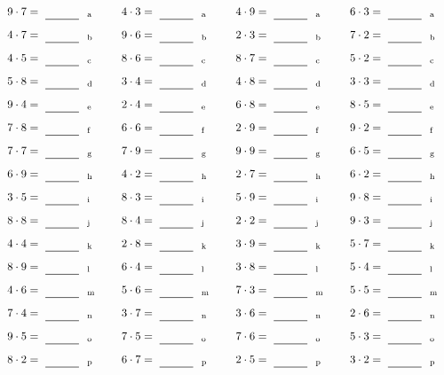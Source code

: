 \documentclass
[
  draft    = true,
  fontsize = 11pt,
  parskip  = half-
]
{scrartcl}
\begin{document}
\par\vfill\par
\begin{align*}
    \pline{9\cdot7}&=\rline{a}
  & \pline{4\cdot3}&=\rline{a}
  & \pline{4\cdot9}&=\rline{a}
  & \pline{6\cdot3}&=\rline{a} \\[1ex]
    \pline{4\cdot7}&=\rline{b}
  & \pline{9\cdot6}&=\rline{b}
  & \pline{2\cdot3}&=\rline{b}
  & \pline{7\cdot2}&=\rline{b} \\[1ex]
    \pline{4\cdot5}&=\rline{c}
  & \pline{8\cdot6}&=\rline{c}
  & \pline{8\cdot7}&=\rline{c}
  & \pline{5\cdot2}&=\rline{c} \\[1ex]
    \pline{5\cdot8}&=\rline{d}
  & \pline{3\cdot4}&=\rline{d}
  & \pline{4\cdot8}&=\rline{d}
  & \pline{3\cdot3}&=\rline{d} \\[1ex]
    \pline{9\cdot4}&=\rline{e}
  & \pline{2\cdot4}&=\rline{e}
  & \pline{6\cdot8}&=\rline{e}
  & \pline{8\cdot5}&=\rline{e} \\[1ex]
    \pline{7\cdot8}&=\rline{f}
  & \pline{6\cdot6}&=\rline{f}
  & \pline{2\cdot9}&=\rline{f}
  & \pline{9\cdot2}&=\rline{f} \\[1ex]
    \pline{7\cdot7}&=\rline{g}
  & \pline{7\cdot9}&=\rline{g}
  & \pline{9\cdot9}&=\rline{g}
  & \pline{6\cdot5}&=\rline{g} \\[1ex]
    \pline{6\cdot9}&=\rline{h}
  & \pline{4\cdot2}&=\rline{h}
  & \pline{2\cdot7}&=\rline{h}
  & \pline{6\cdot2}&=\rline{h} \\[1ex]
    \pline{3\cdot5}&=\rline{i}
  & \pline{8\cdot3}&=\rline{i}
  & \pline{5\cdot9}&=\rline{i}
  & \pline{9\cdot8}&=\rline{i} \\[1ex]
    \pline{8\cdot8}&=\rline{j}
  & \pline{8\cdot4}&=\rline{j}
  & \pline{2\cdot2}&=\rline{j}
  & \pline{9\cdot3}&=\rline{j} \\[1ex]
    \pline{4\cdot4}&=\rline{k}
  & \pline{2\cdot8}&=\rline{k}
  & \pline{3\cdot9}&=\rline{k}
  & \pline{5\cdot7}&=\rline{k} \\[1ex]
    \pline{8\cdot9}&=\rline{l}
  & \pline{6\cdot4}&=\rline{l}
  & \pline{3\cdot8}&=\rline{l}
  & \pline{5\cdot4}&=\rline{l} \\[1ex]
    \pline{4\cdot6}&=\rline{m}
  & \pline{5\cdot6}&=\rline{m}
  & \pline{7\cdot3}&=\rline{m}
  & \pline{5\cdot5}&=\rline{m} \\[1ex]
    \pline{7\cdot4}&=\rline{n}
  & \pline{3\cdot7}&=\rline{n}
  & \pline{3\cdot6}&=\rline{n}
  & \pline{2\cdot6}&=\rline{n} \\[1ex]
    \pline{9\cdot5}&=\rline{o}
  & \pline{7\cdot5}&=\rline{o}
  & \pline{7\cdot6}&=\rline{o}
  & \pline{5\cdot3}&=\rline{o} \\[1ex]
    \pline{8\cdot2}&=\rline{p}
  & \pline{6\cdot7}&=\rline{p}
  & \pline{2\cdot5}&=\rline{p}
  & \pline{3\cdot2}&=\rline{p}
\end{align*}
\end{document}
